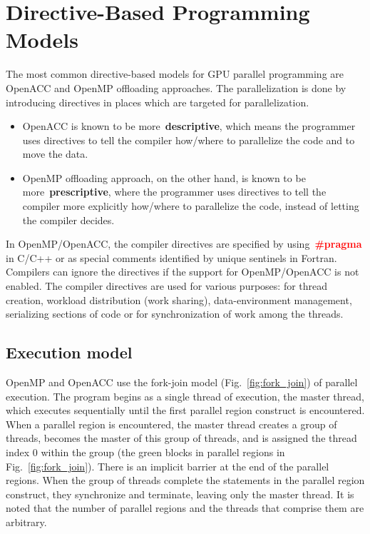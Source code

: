 \section{Directive-Based Programming Models}


\par
The most common directive-based models for GPU parallel programming are OpenACC and OpenMP offloading approaches.
The parallelization is done by introducing directives in places which are targeted for parallelization.
\begin{itemize}
    \item OpenACC is known to be more~\textbf{descriptive}, which means the programmer uses directives to tell the compiler how/where to parallelize the code and to move the data.
    \item OpenMP offloading approach, on the other hand, is known to be more~\textbf{prescriptive}, where the programmer uses directives to tell the compiler more explicitly how/where to parallelize the code, instead of letting the compiler decides.
\end{itemize}


\par
In OpenMP/OpenACC, the compiler directives are specified by using~\textbf{\textcolor{red}{\#pragma}} in C/C++ or as special comments identified by unique sentinels in Fortran.
Compilers can ignore the directives if the support for OpenMP/OpenACC is not enabled.
The compiler directives are used for various purposes: for thread creation, workload distribution (work sharing), data-environment management, serializing sections of code or for synchronization of work among the threads.




\subsection{Execution model}


\par
OpenMP and OpenACC use the fork-join model (Fig.~\ref{fig:fork_join}) of parallel execution.
The program begins as a single thread of execution, the master thread, which executes sequentially until the first parallel region construct is encountered.
When a parallel region is encountered, the master thread creates a group of threads, becomes the master of this group of threads, and is assigned the thread index 0 within the group (the green blocks in parallel regions in Fig.~\ref{fig:fork_join}).
There is an implicit barrier at the end of the parallel regions.
When the group of threads complete the statements in the parallel region construct, they synchronize and terminate, leaving only the master thread.
It is noted that the number of parallel regions and the threads that comprise them are arbitrary.


